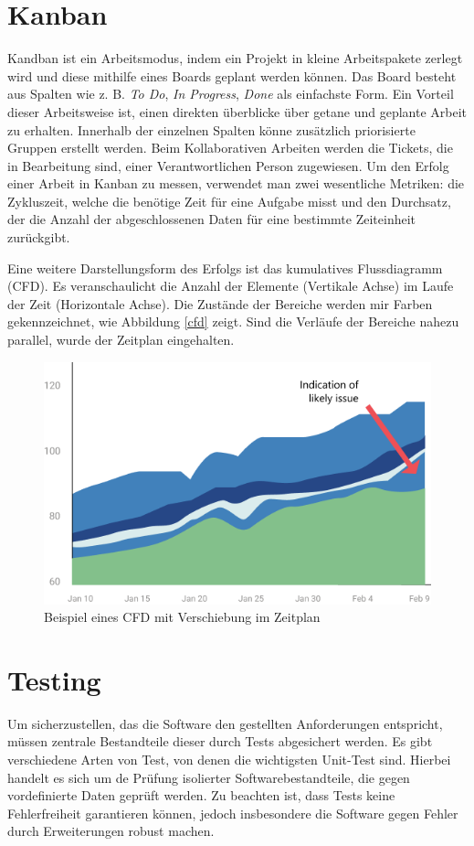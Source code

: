 \section{Kanban}
Kandban ist ein Arbeitsmodus, indem ein Projekt in kleine Arbeitspakete zerlegt wird und diese mithilfe eines Boards geplant werden können.
Das Board besteht aus Spalten wie z. B. \emph{To Do}, \emph{In Progress}, \emph{Done} als einfachste Form.
Ein Vorteil dieser Arbeitsweise ist, einen direkten überblicke über getane und geplante Arbeit zu erhalten.
Innerhalb der einzelnen Spalten könne zusätzlich priorisierte Gruppen erstellt werden.
Beim Kollaborativen Arbeiten werden die Tickets, die in Bearbeitung sind, einer Verantwortlichen Person zugewiesen.
Um den Erfolg einer Arbeit in Kanban zu messen, verwendet man zwei wesentliche Metriken: die Zykluszeit, welche die benötige Zeit für eine Aufgabe misst und den Durchsatz, der die Anzahl der abgeschlossenen Daten für eine bestimmte Zeiteinheit zurückgibt. \cite{kanban}

Eine weitere Darstellungsform des Erfolgs ist das kumulatives Flussdiagramm (CFD). 
Es veranschaulicht die Anzahl der Elemente (Vertikale Achse) im Laufe der Zeit (Horizontale Achse). 
Die Zustände der Bereiche werden mir Farben gekennzeichnet, wie Abbildung \vref{cfd} zeigt. 
Sind die Verläufe der Bereiche nahezu parallel, wurde der Zeitplan eingehalten.

\begin{figure}[ht]
	\centering
	\includegraphics[width=0.7\linewidth]{kanban-cumulative-flow-2.png}
	\caption{Beispiel eines CFD mit Verschiebung im Zeitplan}
	\label{cfd}
\end{figure}

\section{Testing}
Um sicherzustellen, das die Software den gestellten Anforderungen entspricht, müssen zentrale Bestandteile dieser durch Tests abgesichert werden.
Es gibt verschiedene Arten von Test, von denen die wichtigsten Unit-Test sind.
Hierbei handelt es sich um de Prüfung isolierter Softwarebestandteile, die gegen vordefinierte Daten geprüft werden.
Zu beachten ist, dass Tests keine Fehlerfreiheit garantieren können, jedoch insbesondere die Software gegen Fehler durch Erweiterungen robust machen.\cite{ms-testing}

